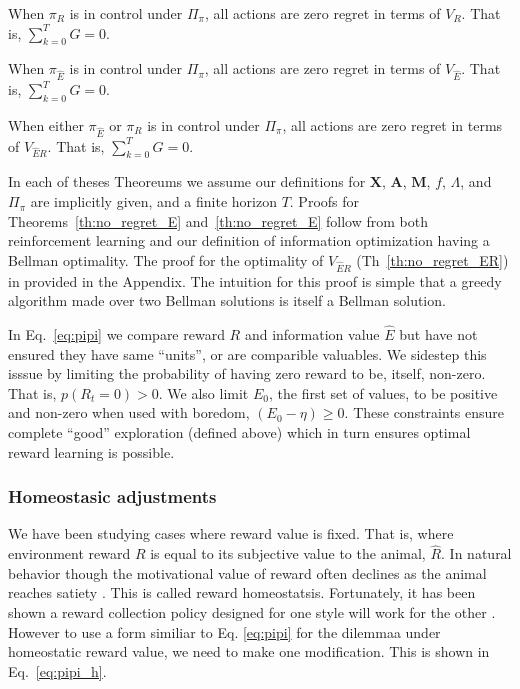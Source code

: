 \begin{theorem}
	\label{th:no_regret_R}
	When $\pi_R$ is in control under $\Pi_{\pi}$, all actions are zero regret in terms of $V_R$. That is, $\sum_{k=0}^{T} G = 0$.
\end{theorem}

\begin{theorem}
	\label{th:no_regret_E}
	When $\pi_{\hat E}$ is in control under $\Pi_{\pi}$, all actions are zero regret in terms of $V_{\hat E}$. That is, $\sum_{k=0}^{T} G = 0$.
\end{theorem}

\begin{theorem}
	\label{th:no_regret_ER}
	When either $\pi_{\hat E}$ or $\pi_R$ is in control under $\Pi_{\pi}$, all actions are zero regret in terms of $V_{\hat{E}R}$. That is, $\sum_{k=0}^{T} G = 0$.
\end{theorem}

In each of theses Theoreums we assume our definitions for $\mathbf{X}$, $\mathbf{A}$, $\mathbf{M}$, $f$, $\Lambda$, and $\Pi_{\pi}$ are implicitly given, and a finite horizon $T$. Proofs for Theorems~\ref{th:no_regret_E} and~\ref{th:no_regret_E} follow from both reinforcement learning and our definition of information optimization having a Bellman optimality. The proof for the optimality of $V_{\hat{E}R}$ (Th~\ref{th:no_regret_ER}) in provided in the Appendix. The intuition for this proof is simple that a greedy algorithm made over two Bellman solutions is itself a Bellman solution.

In Eq.~\ref{eq:pipi} we compare reward $R$ and information value $\hat E$ but have not ensured they have same ``units'', or are comparible valuables. We sidestep this isssue by limiting the probability of having zero reward to be, itself, non-zero. That is, $p(R_t=0) > 0$. We also limit $E_0$, the first set of values, to be positive and non-zero when used with boredom, $(E_0 - \eta) \geq 0$. These constraints ensure complete ``good'' exploration (defined above) which in turn ensures optimal reward learning is possible.

\subsubsection*{Homeostasic adjustments}
We have been studying cases where reward value is fixed. That is, where environment reward $R$ is equal to its subjective value to the animal, $\hat R$. In natural behavior though the motivational value of reward often declines as the animal reaches satiety \citep{Keramati2014,Juechems2019,Munch2020}. This is called reward homeostatsis. Fortunately, it has been shown a reward collection policy designed for one style will work for the other \citep{Keramati2014}. However to use a form similiar to Eq. \ref{eq:pipi} for the dilemmaa under homeostatic reward value, we need to make one modification. This is shown in Eq.~\ref{eq:pipi_h}. 

